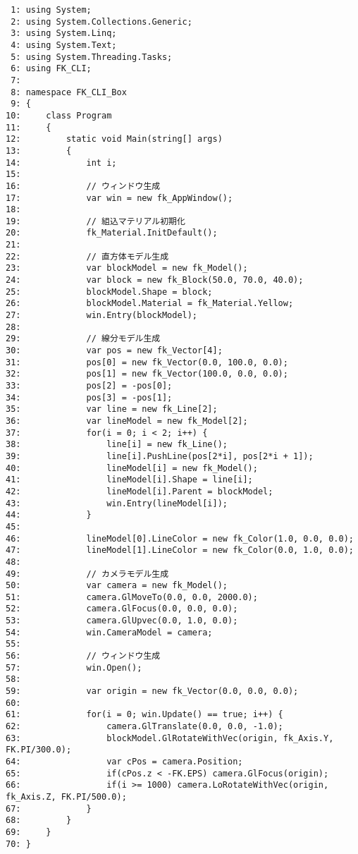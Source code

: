\begin{breakbox}
\begin{small}
\begin{verbatim}
 1: using System;
 2: using System.Collections.Generic;
 3: using System.Linq;
 4: using System.Text;
 5: using System.Threading.Tasks;
 6: using FK_CLI;
 7: 
 8: namespace FK_CLI_Box
 9: {
10:     class Program
11:     {
12:         static void Main(string[] args)
13:         {
14:             int i;
15: 
16:             // ウィンドウ生成
17:             var win = new fk_AppWindow();
18: 
19:             // 組込マテリアル初期化
20:             fk_Material.InitDefault();
21: 
22:             // 直方体モデル生成
23:             var blockModel = new fk_Model();
24:             var block = new fk_Block(50.0, 70.0, 40.0);
25:             blockModel.Shape = block;
26:             blockModel.Material = fk_Material.Yellow;
27:             win.Entry(blockModel);
28: 
29:             // 線分モデル生成
30:             var pos = new fk_Vector[4];
31:             pos[0] = new fk_Vector(0.0, 100.0, 0.0);
32:             pos[1] = new fk_Vector(100.0, 0.0, 0.0);
33:             pos[2] = -pos[0];
34:             pos[3] = -pos[1];
35:             var line = new fk_Line[2];
36:             var lineModel = new fk_Model[2];
37:             for(i = 0; i < 2; i++) {
38:                 line[i] = new fk_Line();
39:                 line[i].PushLine(pos[2*i], pos[2*i + 1]);
40:                 lineModel[i] = new fk_Model();
41:                 lineModel[i].Shape = line[i];
42:                 lineModel[i].Parent = blockModel;
43:                 win.Entry(lineModel[i]);
44:             }
45: 
46:             lineModel[0].LineColor = new fk_Color(1.0, 0.0, 0.0);
47:             lineModel[1].LineColor = new fk_Color(0.0, 1.0, 0.0);
48: 
49:             // カメラモデル生成
50:             var camera = new fk_Model();
51:             camera.GlMoveTo(0.0, 0.0, 2000.0);
52:             camera.GlFocus(0.0, 0.0, 0.0);
53:             camera.GlUpvec(0.0, 1.0, 0.0);
54:             win.CameraModel = camera;
55: 
56:             // ウィンドウ生成
57:             win.Open();
58: 
59:             var origin = new fk_Vector(0.0, 0.0, 0.0);
60: 
61:             for(i = 0; win.Update() == true; i++) {
62:                 camera.GlTranslate(0.0, 0.0, -1.0);
63:                 blockModel.GlRotateWithVec(origin, fk_Axis.Y, FK.PI/300.0);
64:                 var cPos = camera.Position;
65:                 if(cPos.z < -FK.EPS) camera.GlFocus(origin);
66:                 if(i >= 1000) camera.LoRotateWithVec(origin, fk_Axis.Z, FK.PI/500.0);
67:             }
68:         }
69:     }
70: }
\end{verbatim}
\end{small}
\end{breakbox}
~

